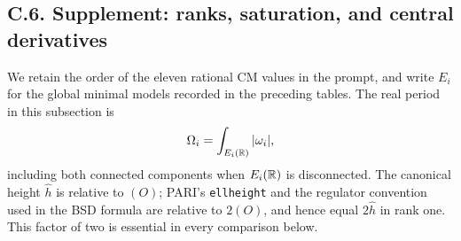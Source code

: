 \subsection{C.6. Supplement: ranks, saturation, and central derivatives}

We retain the order of the eleven rational CM values in the prompt, and
write $E_i$ for the global minimal models recorded in the preceding
tables. The real period in this subsection is
\[
 \Omega_i=\int_{E_i(\mathbb R)}|\omega_i|,
\]
including both connected components when $E_i(\mathbb R)$ is disconnected.
The canonical height $\widehat h$ is relative to $(O)$; PARI's
\texttt{ellheight} and the regulator convention used in the BSD formula
are relative to $2(O)$, and hence equal $2\widehat h$ in rank one.
This factor of two is essential in every comparison below.

